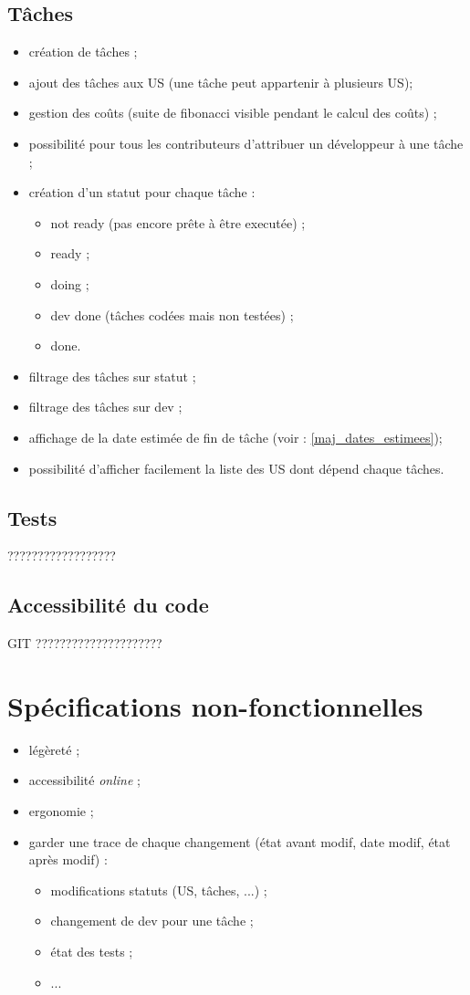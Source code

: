 \subsection{T\^aches}
\begin{itemize}
\item cr\'eation de t\^aches\label{tache} ;
\item ajout des t\^aches aux US (une t\^ache peut appartenir \`a plusieurs US);
\item gestion des co\^uts (suite de fibonacci visible pendant le calcul des co\^uts) ;
\item possibilit\'e pour tous les contributeurs d'attribuer un d\'eveloppeur \`a une t\^ache ;
\item  cr\'eation d'un statut pour chaque t\^ache :
\begin{itemize}
\item not ready (pas encore pr\^ete \`a \^etre execut\'ee) ;
\item ready ;
\item doing ;
\item dev done (t\^aches cod\'ees mais non test\'ees) ;
\item done.
\end{itemize}
\item filtrage des t\^aches sur statut ;
\item filtrage des t\^aches sur dev ;
\item affichage de la date estim\'ee de fin de t\^ache (voir : \ref{maj_dates_estimees});
\item possibilit\'e d'afficher facilement la liste des US dont d\'epend chaque t\^aches.
\end{itemize}
\subsection{Tests}
??????????????????
\subsection{Accessibilit\'e du code}
GIT ?????????????????????

\section{Sp\'ecifications non-fonctionnelles}
\begin{itemize}
\item l\'eg\`eret\'e ;
\item accessibilit\'e \textit{online} ;
\item ergonomie ;
\item garder une trace de chaque changement (\'etat avant modif, date modif, \'etat apr\`es modif) :
\begin{itemize}
\item modifications statuts (US, t\^aches, ...) ;
\item changement de dev pour une t\^ache ;
\item \'etat des tests ;
\item ...
\end{itemize}
\end{itemize}